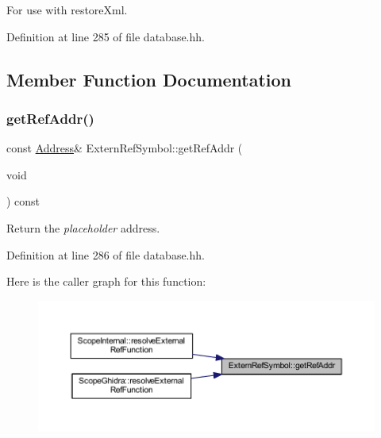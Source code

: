 For use with restore\+Xml. 



Definition at line 285 of file database.\+hh.



\subsection{Member Function Documentation}
\mbox{\label{class_extern_ref_symbol_a8bd2e8984b35871f657d88cee1464390}} 
\subsubsection{\texorpdfstring{getRefAddr()}{getRefAddr()}}
{\footnotesize\ttfamily const \mbox{\hyperlink{class_address}{Address}}\& Extern\+Ref\+Symbol\+::get\+Ref\+Addr (\begin{DoxyParamCaption}\item[{void}]{ }\end{DoxyParamCaption}) const\hspace{0.3cm}{\ttfamily [inline]}}



Return the {\itshape placeholder} address. 



Definition at line 286 of file database.\+hh.

Here is the caller graph for this function\+:
\nopagebreak
\begin{figure}[H]
\begin{center}
\leavevmode
\includegraphics[width=350pt]{class_extern_ref_symbol_a8bd2e8984b35871f657d88cee1464390_icgraph}
\end{center}
\end{figure}
\mbox{\label{class_extern_ref_symbol_a84cae4cba0ca0ec757c93c63cd55921e}} 
